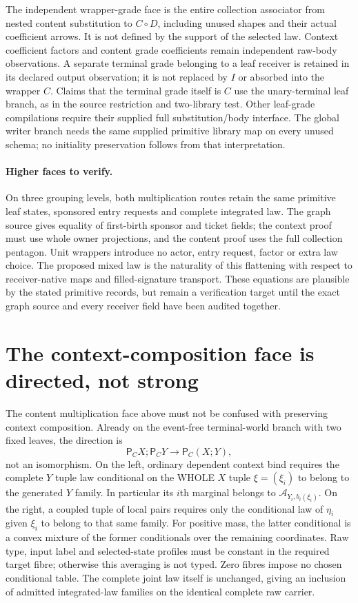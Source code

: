\documentclass[11pt]{article}
\begin{document}
The independent wrapper-grade face is the entire collection associator from nested content substitution to $C\circ D$, including unused shapes and their actual coefficient arrows. It is not defined by the support of the selected law. Context coefficient factors and content grade coefficients remain independent raw-body observations. A separate terminal grade belonging to a leaf receiver is retained in its declared output observation; it is not replaced by $I$ or absorbed into the wrapper $C$. Claims that the terminal grade itself is $C$ use the unary-terminal leaf branch, as in the source restriction and two-library test. Other leaf-grade compilations require their supplied full substitution/body interface. The global writer branch needs the same supplied primitive library map on every unused schema; no initiality preservation follows from that interpretation.

\paragraph{Higher faces to verify.} On three grouping levels, both multiplication routes retain the same primitive leaf states, sponsored entry requests and complete integrated law. The graph source gives equality of first-birth sponsor and ticket fields; the context proof must use whole owner projections, and the content proof uses the full collection pentagon. Unit wrappers introduce no actor, entry request, factor or extra law choice. The proposed mixed law is the naturality of this flattening with respect to receiver-native maps and filled-signature transport. These equations are plausible by the stated primitive records, but remain a verification target until the exact graph source and every receiver field have been audited together.

\section{The context-composition face is directed, not strong}
The content multiplication face above must not be confused with preserving context composition. Already on the event-free terminal-world branch with two fixed leaves, the direction is
\[
 \mathsf P_CX;\mathsf P_CY\longrightarrow\mathsf P_C(X;Y),       \tag{10}
\]
not an isomorphism. On the left, ordinary dependent context bind requires the complete $Y$ tuple law conditional on the WHOLE $X$ tuple $\xi=(\xi_i)$ to belong to the generated $Y$ family. In particular its $i$th marginal belongs to $\mathcal A_{Y_i,b_i(\xi_i)}$. On the right, a coupled tuple of local pairs requires only the conditional law of $\eta_i$ given $\xi_i$ to belong to that same family. For positive mass, the latter conditional is a convex mixture of the former conditionals over the remaining coordinates. Raw type, input label and selected-state profiles must be constant in the required target fibre; otherwise this averaging is not typed. Zero fibres impose no chosen conditional table. The complete joint law itself is unchanged, giving an inclusion of admitted integrated-law families on the identical complete raw carrier.
\end{document}

